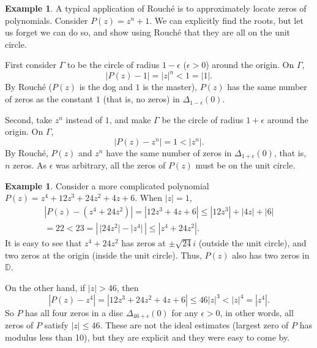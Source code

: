 \documentclass[12pt,openany]{book}
\newcommand{\sabs}[1]{\lvert {#1} \rvert}
\newcommand{\abs}[1]{\left\lvert {#1} \right\rvert}
\newcommand{\D}{{\mathbb{D}}}
\theoremstyle{plain}
\theoremstyle{remark}
\theoremstyle{definition}
\theoremstyle{exercise}
\theoremstyle{example}
\newtheorem{example}[thm]{Example}
\begin{document}
\begin{example}
A typical application of Rouch\'e is to approximately locate zeros of
polynomials.  Consider $P(z) = z^n + 1$.  We can explicitly find the roots,
but let us forget we can do so,
and show using Rouch\'e that they are all on the unit circle.

First
consider $\Gamma$ to be the circle of radius $1-\epsilon$ ($\epsilon > 0$)
around the origin.  On $\Gamma$,
\begin{equation*}
\abs{P(z) - 1} = \abs{z}^n < 1 = \sabs{1}.
\end{equation*}
By Rouch\'e ($P(z)$ is the dog and $1$ is the master), $P(z)$
has the same number of zeros as the constant $1$ (that is, no zeros) in
$\Delta_{1-\epsilon}(0)$.

Second, take $z^n$ instead of $1$, and make $\Gamma$ be the circle of
radius $1+\epsilon$ around the origin.  On $\Gamma$,
\begin{equation*}
\abs{P(z) - z^n} = 1 < \abs{z^n} .
\end{equation*}
By Rouch\'e, $P(z)$ and $z^n$ have the same number of zeros in
$\Delta_{1+\epsilon}(0)$, that is, $n$ zeros.  As $\epsilon$ was arbitrary,
all the zeros of $P(z)$ must be on the unit circle.
\end{example}

\begin{example}
Consider a more complicated polynomial $P(z) = z^4+12z^3+24z^2+4z+6$.
When $\sabs{z}=1$,
\begin{multline*}
\abs{P(z)-(z^4+24z^2)} =
\abs{12z^3+4z+6} \leq
\abs{12z^3}+\abs{4z}+\abs{6} \\
= 22 < 23 = \abs{\,\sabs{24 z^2} - \sabs{z^4}\,}
\leq \abs{z^4+24z^2} .
\end{multline*}
It is easy to see that $z^4+24z^2$ has zeros at $\pm \sqrt{24} i$ (outside
the unit circle), and two zeros at the origin (inside the unit circle).
Thus, $P(z)$ also has two zeros in $\D$.

On the other hand, if $\sabs{z} > 46$, then
\begin{equation*}
\abs{P(z)-z^4} = \abs{12z^3+24z^2+4z+6}
\leq 46 \sabs{z}^3 < {\sabs{z}}^4 = \abs{z^4}.
\end{equation*}
So $P$ has all four zeros in a disc $\Delta_{46+\epsilon}(0)$ for any
$\epsilon > 0$,
in other words, all zeros of $P$ satisfy $\sabs{z} \leq 46$.
These are not the ideal estimates (largest zero of $P$ has modulus less than
10), but they are explicit and they were easy to come by.
\end{example}
\end{document}
